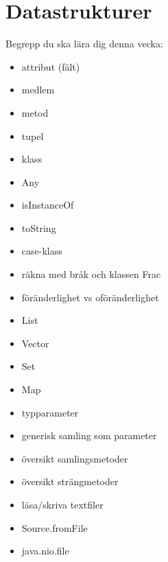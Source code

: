 \chapter{Datastrukturer}\label{chapter:W04}
Begrepp du ska lära dig denna vecka:
\begin{multicols}{2}\begin{itemize}[nosep,label={$\square$},leftmargin=*]
\item attribut (fält)
\item medlem
\item metod
\item tupel
\item klass
\item Any
\item isInstanceOf
\item toString
\item case-klass
\item räkna med bråk och klassen Frac
\item föränderlighet vs oföränderlighet
\item List
\item Vector
\item Set
\item Map
\item typparameter
\item generisk samling som parameter
\item översikt samlingsmetoder
\item översikt strängmetoder
\item läsa/skriva textfiler
\item Source.fromFile
\item java.nio.file\end{itemize}\end{multicols}
